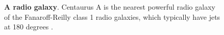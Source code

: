 \begin{figure}
\centering
{}
\caption[Radio galaxy]{\textbf{A radio galaxy}. Centaurus A is the nearest powerful radio galaxy of the Fanaroff-Reilly class 1 radio galaxies, which typically have jets at 180 degrees \cite{feain2011radio}. }
\label{fig:centa}
\end{figure}



